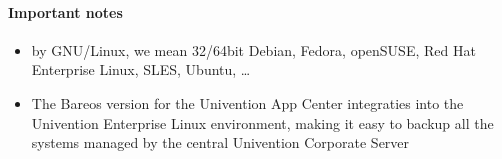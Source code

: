 \paragraph{Important notes}

\begin{itemize}
\item by GNU/Linux, we mean 32/64bit Debian, Fedora, openSUSE, Red Hat Enterprise Linux, SLES, Ubuntu, \dots
\item The Bareos version for the Univention App Center integraties into the Univention Enterprise Linux environment, making it easy to backup all the systems managed by the central Univention Corporate Server
\end{itemize}

